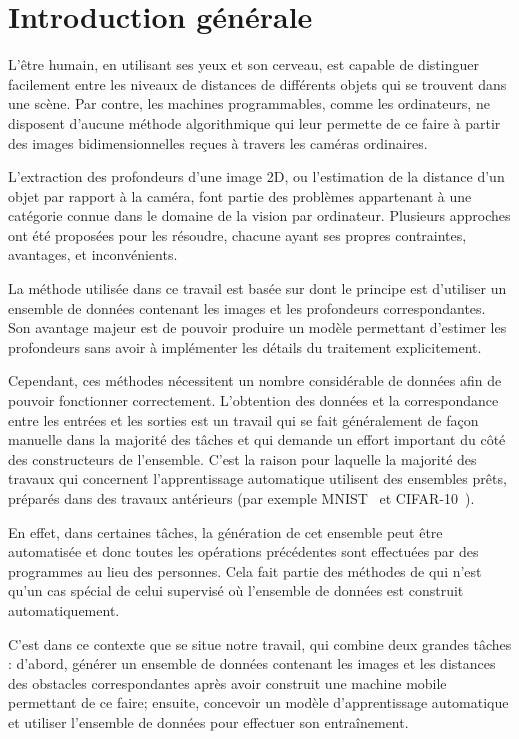 \chapter*{Introduction générale}

L'être humain, en utilisant ses yeux et son cerveau, est capable de distinguer facilement
entre les niveaux de distances de différents objets qui se trouvent dans une scène.
Par contre, les machines programmables, comme les ordinateurs, ne disposent d'aucune
méthode algorithmique qui leur permette de ce faire à partir des images bidimensionnelles
reçues à travers les caméras ordinaires.

L'extraction des profondeurs d'une image 2D, ou l'estimation de la distance
d'un objet par rapport à la caméra, font partie des problèmes appartenant à une catégorie
connue dans le domaine de la vision par ordinateur. Plusieurs approches ont été
proposées pour les résoudre, chacune ayant ses propres contraintes, avantages, et
inconvénients.

La méthode utilisée dans ce travail est basée sur  dont le principe est d'utiliser un ensemble de données contenant les
images et les profondeurs correspondantes. Son avantage majeur est de pouvoir
produire un modèle permettant d'estimer les profondeurs sans avoir à implémenter
les détails du traitement explicitement.

Cependant, ces méthodes nécessitent
un nombre considérable de données afin de pouvoir fonctionner correctement.
L'obtention des données et la correspondance entre les entrées et les sorties
est un travail qui se fait généralement de façon manuelle dans la majorité des tâches
et qui demande un effort important du côté des constructeurs de l'ensemble. C'est la
raison pour laquelle la majorité des travaux qui concernent l'apprentissage automatique
utilisent des ensembles prêts, préparés dans des travaux antérieurs (par exemple
MNIST~\cite{lecun2010mnist} et CIFAR-10~\cite{krizhevsky2009learning}).

En effet, dans certaines tâches, la génération de cet ensemble peut être automatisée
et donc toutes les opérations précédentes sont effectuées par des programmes au lieu
des personnes. Cela fait partie des méthodes de  qui n'est qu'un cas spécial de celui supervisé où
l'ensemble de données est construit automatiquement.

C'est dans ce contexte que se situe notre travail, qui combine deux
grandes tâches : d'abord, générer un ensemble de données contenant les images et les distances
des obstacles correspondantes après avoir construit une machine mobile permettant
de ce faire; ensuite, concevoir un modèle d'apprentissage automatique et utiliser
l'ensemble de données pour effectuer son entraînement.

